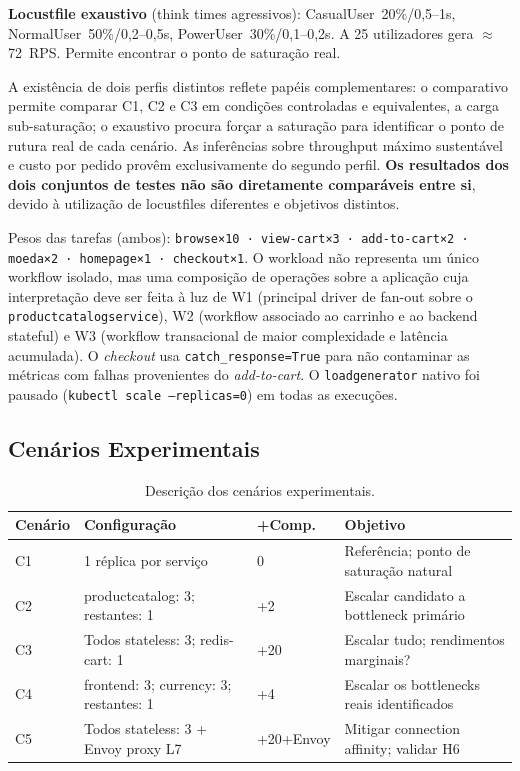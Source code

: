 \documentclass[manuscript,screen,review]{acmart}
\begin{document}
\textbf{Locustfile exaustivo} (think times agressivos): CasualUser~20\%/0,5--1s, NormalUser~50\%/0,2--0,5s, PowerUser~30\%/0,1--0,2s. A 25 utilizadores gera $\approx$72~RPS. Permite encontrar o ponto de saturação real.

A existência de dois perfis distintos reflete papéis complementares: o comparativo permite comparar C1, C2 e C3 em condições controladas e equivalentes, a carga sub-saturação; o exaustivo procura forçar a saturação para identificar o ponto de rutura real de cada cenário. As inferências sobre throughput máximo sustentável e custo por pedido provêm exclusivamente do segundo perfil. \textbf{Os resultados dos dois conjuntos de testes não são diretamente comparáveis entre si}, devido à utilização de locustfiles diferentes e objetivos distintos.

Pesos das tarefas (ambos): \texttt{browse×10 · view-cart×3 · add-to-cart×2 · moeda×2 · homepage×1 · checkout×1}. O workload não representa um único workflow isolado, mas uma composição de operações sobre a aplicação cuja interpretação deve ser feita à luz de W1 (principal driver de fan-out sobre o \texttt{productcatalogservice}), W2 (workflow associado ao carrinho e ao backend stateful) e W3 (workflow transacional de maior complexidade e latência acumulada). O \textit{checkout} usa \texttt{catch\_response=True} para não contaminar as métricas com falhas provenientes do \textit{add-to-cart}. O \texttt{loadgenerator} nativo foi pausado (\texttt{kubectl scale --replicas=0}) em todas as execuções.

\subsection{Cenários Experimentais}

\begin{table}[t]
\caption{Descrição dos cenários experimentais.}
\label{tab:cenarios}
\begin{tabularx}{\columnwidth}{lXlX}
\toprule
\textbf{Cenário} & \textbf{Configuração} & \textbf{+Comp.} & \textbf{Objetivo} \\
\midrule
C1 & 1 réplica por serviço & 0 & Referência; ponto de saturação natural \\
C2 & productcatalog: 3; restantes: 1 & +2 & Escalar candidato a bottleneck primário \\
C3 & Todos stateless: 3; redis-cart: 1 & +20 & Escalar tudo; rendimentos marginais? \\
C4 & frontend: 3; currency: 3; restantes: 1 & +4 & Escalar os bottlenecks reais identificados \\
C5 & Todos stateless: 3 + Envoy proxy L7 & +20+Envoy & Mitigar connection affinity; validar H6 \\
\bottomrule
\end{tabularx}
\end{table}
\end{document}
